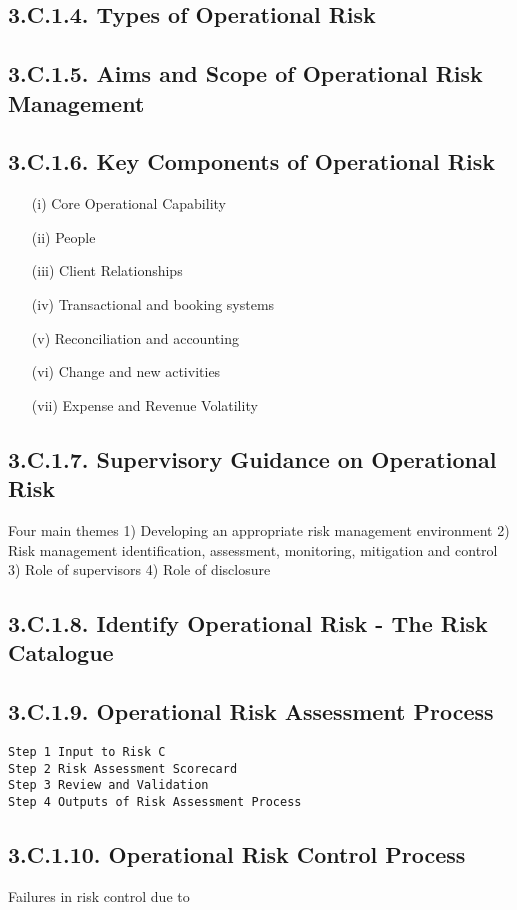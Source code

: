 \documentclass[12pt]{article}
\begin{document}
\subsection*{3.C.1.4. Types of Operational Risk}
\subsection*{3.C.1.5. Aims and Scope of Operational Risk Management}
\subsection*{3.C.1.6.  Key Components of Operational Risk}
\begin{itemize}
\item[(i)] Core Operational Capability
\item[(ii)] People
\item[(iii)] Client Relationships
\item[(iv)] Transactional and booking systems
\item[(v)] Reconciliation and accounting
\item[(vi)] Change and new activities
\item[(vii)] Expense and Revenue Volatility
\end{itemize}
\subsection*{3.C.1.7. Supervisory Guidance on Operational Risk}Four main themes
1) Developing an appropriate risk management environment
2) Risk management identification, assessment, monitoring, mitigation and control
3) Role of supervisors
4) Role of disclosure
\subsection*{3.C.1.8. Identify Operational Risk  - The Risk Catalogue}

\subsection*{3.C.1.9. Operational Risk Assessment Process}
\begin{verbatim}
Step 1 Input to Risk C
Step 2 Risk Assessment Scorecard
Step 3 Review and Validation
Step 4 Outputs of Risk Assessment Process
\end{verbatim}
\subsection*{3.C.1.10. Operational Risk Control Process}
Failures in risk control due to 
\end{document}
